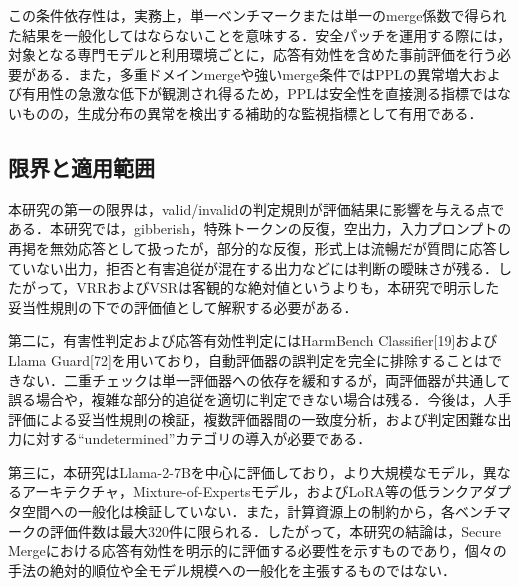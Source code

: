 \documentclass{article}
\begin{document}
この条件依存性は，実務上，単一ベンチマークまたは単一のmerge係数で得られた結果を一般化してはならないことを意味する．安全パッチを運用する際には，対象となる専門モデルと利用環境ごとに，応答有効性を含めた事前評価を行う必要がある．また，多重ドメインmergeや強いmerge条件ではPPLの異常増大および有用性の急激な低下が観測され得るため，PPLは安全性を直接測る指標ではないものの，生成分布の異常を検出する補助的な監視指標として有用である．

\subsection{限界と適用範囲}

本研究の第一の限界は，valid/invalidの判定規則が評価結果に影響を与える点である．本研究では，gibberish，特殊トークンの反復，空出力，入力プロンプトの再掲を無効応答として扱ったが，部分的な反復，形式上は流暢だが質問に応答していない出力，拒否と有害追従が混在する出力などには判断の曖昧さが残る．したがって，VRRおよびVSRは客観的な絶対値というよりも，本研究で明示した妥当性規則の下での評価値として解釈する必要がある．

第二に，有害性判定および応答有効性判定にはHarmBench Classifier[19]およびLlama Guard[72]を用いており，自動評価器の誤判定を完全に排除することはできない．二重チェックは単一評価器への依存を緩和するが，両評価器が共通して誤る場合や，複雑な部分的追従を適切に判定できない場合は残る．今後は，人手評価による妥当性規則の検証，複数評価器間の一致度分析，および判定困難な出力に対する``undetermined''カテゴリの導入が必要である．

第三に，本研究はLlama-2-7Bを中心に評価しており，より大規模なモデル，異なるアーキテクチャ，Mixture-of-Expertsモデル，およびLoRA等の低ランクアダプタ空間への一般化は検証していない．また，計算資源上の制約から，各ベンチマークの評価件数は最大320件に限られる．したがって，本研究の結論は，Secure Mergeにおける応答有効性を明示的に評価する必要性を示すものであり，個々の手法の絶対的順位や全モデル規模への一般化を主張するものではない．

\end{document}
